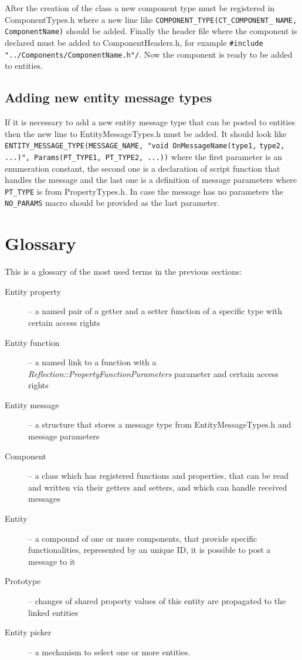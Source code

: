After the creation of the class a new component type must be registered in ComponentTypes.h where a new line like \verb/COMPONENT_TYPE(CT_COMPONENT_/ \verb/NAME, ComponentName)/ should be added. Finally the header file where the component is declared must be added to ComponentHeaders.h, for example \verb|#include "../Components/ComponentName.h"/|. Now the component is ready to be added to entities.

\subsection{Adding new entity message types}
\label{sub:entity-newmessages}

If it is necessary to add a new entity message type that can be posted to entities then the new line to EntityMessageTypes.h must be added. It should look like \verb/ENTITY_MESSAGE_TYPE(MESSAGE_NAME, "void OnMessageName(type1,/
\verb/type2, ...)", Params(PT_TYPE1, PT_TYPE2, ...))/ where the first parameter is an enumeration constant, the second one is a declaration of script function that handles the message and the last one is a definition of message parameters where \verb/PT_TYPE/ is from PropertyTypes.h. In case the message has no parameters the \verb/NO_PARAMS/ macro should be provided as the last parameter.

\section{Glossary}

This is a glossary of the most used terms in the previous sections:

\begin{description}
  \item[Entity property] -- a named pair of a getter and a setter function of a specific type with certain access rights
  \item[Entity function] -- a named link to a function with a \emph{Reflection::Property\-FunctionParameters} parameter and certain access rights
  \item[Entity message] -- a structure that stores a message type from EntityMessageTypes.h and message parameters
  \item[Component] -- a class which has registered functions and properties, that can be read and written via their getters and setters, and which can handle received messages
  \item[Entity] -- a compound of one or more components, that provide specific functionalities, represented by an unique ID, it is possible to post a message to it
  \item[Prototype] -- changes of shared property values of this entity are propagated to the linked entities
  \item[Entity picker] -- a mechanism to select one or more entities.
\end{description}